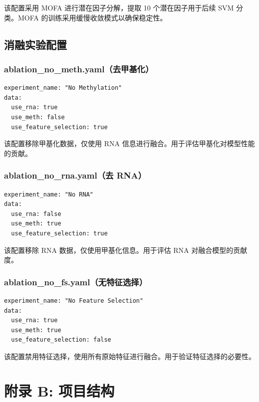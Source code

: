 该配置采用 MOFA 进行潜在因子分解，提取 10 个潜在因子用于后续 SVM 分类。MOFA 的训练采用缓慢收敛模式以确保稳定性。

\subsection*{消融实验配置}

\subsubsection*{ablation\_no\_meth.yaml（去甲基化）}

\begin{verbatim}
experiment_name: "No Methylation"
data:
  use_rna: true
  use_meth: false
  use_feature_selection: true
\end{verbatim}

该配置移除甲基化数据，仅使用 RNA 信息进行融合。用于评估甲基化对模型性能的贡献。

\subsubsection*{ablation\_no\_rna.yaml（去 RNA）}

\begin{verbatim}
experiment_name: "No RNA"
data:
  use_rna: false
  use_meth: true
  use_feature_selection: true
\end{verbatim}

该配置移除 RNA 数据，仅使用甲基化信息。用于评估 RNA 对融合模型的贡献度。

\subsubsection*{ablation\_no\_fs.yaml（无特征选择）}

\begin{verbatim}
experiment_name: "No Feature Selection"
data:
  use_rna: true
  use_meth: true
  use_feature_selection: false
\end{verbatim}

该配置禁用特征选择，使用所有原始特征进行融合。用于验证特征选择的必要性。

\section*{附录 B: 项目结构}

